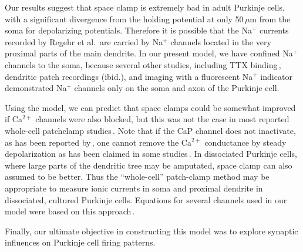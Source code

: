 \documentclass[12pt]{article}
\begin{document}
Our results suggest that space clamp is extremely bad in
adult Purkinje cells, with a significant divergence from the
holding potential at only 50\,$\mu$m from the soma for depolarizing
potentials. Therefore it is possible that the Na$^+$
currents recorded by Regehr et al.\,\cite{Regehr:1992tg} are carried by
Na$^+$ channels located in the very proximal parts of the
main dendrite. In our present model, we have confined
Na$^+$ channels to the soma, because several other studies,
including TTX binding\,\cite{Llinas:1992rq}, dendritic
patch recordings (ibid.), and imaging with a fluorescent
Na$^+$ indicator\,\cite{Lasser-Ross:1992ij} demonstrated
Na$^+$ channels only on the soma and axon of the
Purkinje cell.

Using the model, we can predict that space clamps could
be somewhat improved if Ca$^{2+}$ channels were also blocked,
but this was not the case in most reported whole-cell patchclamp
studies\,\cite{Kaneda:1990ys, Llano:1991qf, Regan:1991ly, Regehr:1992tg}. 
Note that if the CaP channel
does not inactivate, as has been reported by\,\cite{Usowicz:1992qf}, 
one cannot remove the Ca$^{2+}$ conductance by
steady depolarization as has been claimed in some studies\,\cite{Llano:1991qf}. 
In dissociated Purkinje cells, where
large parts of the dendritic tree may be amputated, space
clamp can also assumed to be better. Thus the ``whole-cell''
patch-clamp method may be appropriate to measure ionic
currents in soma and proximal dendrite in dissociated, cultured
Purkinje cells. Equations for several channels used in
our model were based on this approach\,\cite{Hirano:1989uq, Kaneda:1990ys, Regan:1991ly}.

Finally, our ultimate objective in constructing this model
was to explore synaptic influences on Purkinje cell firing
patterns.



\end{document}
